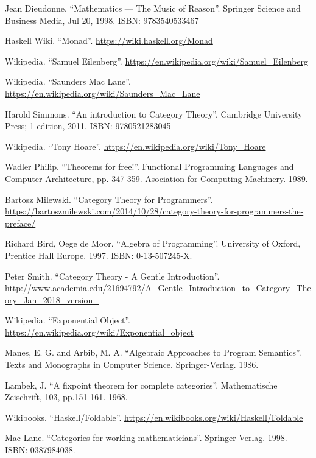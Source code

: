 \documentclass[b5paper]{article}
\begin{document}
\begin{thebibliography}{99}

Jean Dieudonne. ``Mathematics — The Music of Reason''. Springer Science and Business Media, Jul 20, 1998. ISBN: 9783540533467

Haskell Wiki. ``Monad''. \url{https://wiki.haskell.org/Monad}

Wikipedia. ``Samuel Eilenberg''. \url{https://en.wikipedia.org/wiki/Samuel_Eilenberg}

Wikipedia. ``Saunders Mac Lane''. \url{https://en.wikipedia.org/wiki/Saunders_Mac_Lane}

Harold Simmons. ``An introduction to Category Theory''.  Cambridge University Press; 1 edition, 2011. ISBN: 9780521283045

Wikipedia. ``Tony Hoare''. \url{https://en.wikipedia.org/wiki/Tony_Hoare}

Wadler Philip. ``Theorems for free!''. Functional Programming Languages and Computer Architecture, pp. 347-359. Asociation for Computing Machinery. 1989.

Bartosz Milewski. ``Category Theory for Programmers''. \url{https://bartoszmilewski.com/2014/10/28/category-theory-for-programmers-the-preface/}

Richard Bird, Oege de Moor. ``Algebra of Programming''. University of Oxford, Prentice Hall Europe. 1997. ISBN: 0-13-507245-X.

Peter Smith. ``Category Theory - A Gentle Introduction''. \url{http://www.academia.edu/21694792/A_Gentle_Introduction_to_Category_Theory_Jan_2018_version_}

Wikipedia. ``Exponential Object''. \url{https://en.wikipedia.org/wiki/Exponential_object}

Manes, E. G. and Arbib, M. A. ``Algebraic Approaches to Program Semantics''. Texts and Monographs in Computer Science. Springer-Verlag. 1986.

Lambek, J. ``A fixpoint theorem for complete categories''. Mathematische Zeischrift, 103, pp.151-161. 1968.

Wikibooks. ``Haskell/Foldable''.  \url{https://en.wikibooks.org/wiki/Haskell/Foldable}

Mac Lane. ``Categories for working mathematicians''. Springer-Verlag. 1998. ISBN: 0387984038.

\end{thebibliography}

\expandafter\enddocument

\fi
\end{document}
